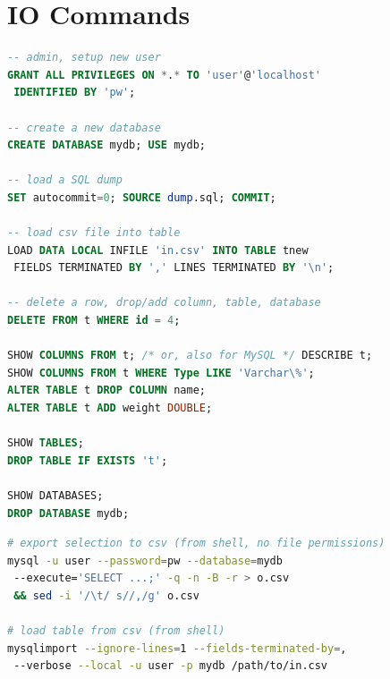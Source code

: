 \section{IO Commands}
\label{sql:io}

\begin{lstlisting}[language=SQL]
-- admin, setup new user
GRANT ALL PRIVILEGES ON *.* TO 'user'@'localhost'
 IDENTIFIED BY 'pw';

-- create a new database
CREATE DATABASE mydb; USE mydb;

-- load a SQL dump
SET autocommit=0; SOURCE dump.sql; COMMIT;

-- load csv file into table
LOAD DATA LOCAL INFILE 'in.csv' INTO TABLE tnew
 FIELDS TERMINATED BY ',' LINES TERMINATED BY '\n';

-- delete a row, drop/add column, table, database
DELETE FROM t WHERE id = 4;

SHOW COLUMNS FROM t; /* or, also for MySQL */ DESCRIBE t;
SHOW COLUMNS FROM t WHERE Type LIKE 'Varchar\%';
ALTER TABLE t DROP COLUMN name;
ALTER TABLE t ADD weight DOUBLE;

SHOW TABLES;
DROP TABLE IF EXISTS 't';

SHOW DATABASES;
DROP DATABASE mydb;
\end{lstlisting}

\begin{lstlisting}[language=bash]
# export selection to csv (from shell, no file permissions)
mysql -u user --password=pw --database=mydb
 --execute='SELECT ...;' -q -n -B -r > o.csv
 && sed -i '/\t/ s//,/g' o.csv

# load table from csv (from shell)
mysqlimport --ignore-lines=1 --fields-terminated-by=,
 --verbose --local -u user -p mydb /path/to/in.csv
\end{lstlisting}
